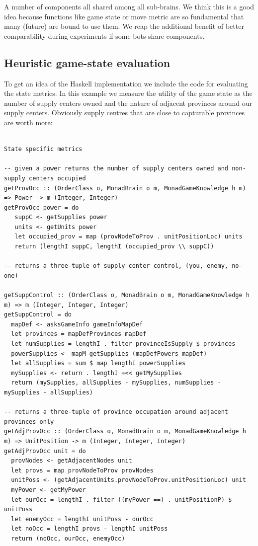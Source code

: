 \documentclass[pdftex,12pt,a4paper]{report}
\begin{document}
A number of components all shared among all sub-brains. We think this is a 
good idea because functions like game state or move metric are so fundamental 
that many (future) are bound to use them. We reap the additional benefit of
better comparability during experiments if some bots share components.

\subsection{Heuristic game-state evaluation}

To get an idea of the Haskell implementation we include the code
for evaluating the state metrics. In this example we measure the
utility of the game state as the number of supply centers owned
and the nature of adjacent provinces around our supply centers. Obviously
supply centres that are close to capturable provinces are worth more:

\begin{verbatim}

State specific metrics

-- given a power returns the number of supply centers owned and non-supply centers occupied
getProvOcc :: (OrderClass o, MonadBrain o m, MonadGameKnowledge h m) => Power -> m (Integer, Integer)
getProvOcc power = do
   suppC <- getSupplies power
   units <- getUnits power
   let occupied_prov = map (provNodeToProv . unitPositionLoc) units
   return (lengthI suppC, lengthI (occupied_prov \\ suppC))

-- returns a three-tuple of supply center control, (you, enemy, no-one)

getSuppControl :: (OrderClass o, MonadBrain o m, MonadGameKnowledge h m) => m (Integer, Integer, Integer)
getSuppControl = do
  mapDef <- asksGameInfo gameInfoMapDef
  let provinces = mapDefProvinces mapDef
  let numSupplies = lengthI . filter provinceIsSupply $ provinces
  powerSupplies <- mapM getSupplies (mapDefPowers mapDef)
  let allSupplies = sum $ map lengthI powerSupplies
  mySupplies <- return . lengthI =<< getMySupplies
  return (mySupplies, allSupplies - mySupplies, numSupplies - mySupplies - allSupplies)

-- returns a three-tuple of province occupation around adjacent provinces only
getAdjProvOcc :: (OrderClass o, MonadBrain o m, MonadGameKnowledge h m) => UnitPosition -> m (Integer, Integer, Integer)
getAdjProvOcc unit = do
  provNodes <- getAdjacentNodes unit
  let provs = map provNodeToProv provNodes
  unitPoss <- (getAdjacentUnits.provNodeToProv.unitPositionLoc) unit
  myPower <- getMyPower
  let ourOcc = lengthI . filter ((myPower ==) . unitPositionP) $ unitPoss
  let enemyOcc = lengthI unitPoss - ourOcc
  let noOcc = lengthI provs - lengthI unitPoss
  return (noOcc, ourOcc, enemyOcc)

\end{verbatim}
\end{document}

